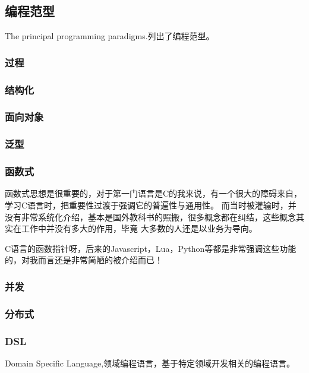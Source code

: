 \subsection{编程范型}
The principal programming paradigms.\cite{TPPP}列出了编程范型。

\subsubsection{过程}

\subsubsection{结构化}

\subsubsection{面向对象}

\subsubsection{泛型}

\subsubsection{函数式}

函数式思想是很重要的，对于第一门语言是C的我来说，有一个很大的障碍来自，学习C语言时，把重要性过渡于强调它的普遍性与通用性。
而当时被灌输时，并没有非常系统化介绍，基本是国外教科书的照搬，很多概念都在纠结，这些概念其实在工作中并没有多大的作用，毕竟
大多数的人还是以业务为导向。

C语言的函数指针呀，后来的Javascript，Lua，Python等都是非常强调这些功能的，对我而言还是非常简陋的被介绍而已！

\subsubsection{并发}

\subsubsection{分布式}

\subsubsection{DSL}
Domain Specific Language,领域编程语言，基于特定领域开发相关的编程语言。

